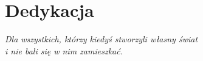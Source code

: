 
\section*{Dedykacja}

\textit{Dla wszystkich, którzy kiedyś stworzyli własny świat\\ i nie bali się w nim zamieszkać.}

\cleardoublepage
